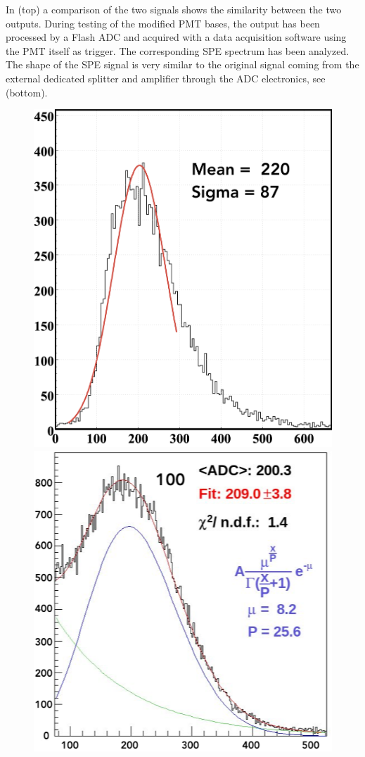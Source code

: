 In  (top) a comparison of the two signals shows the similarity between the two outputs.
During testing of the modified PMT bases, the output has been processed by a Flash ADC and acquired with a data
acquisition software using the PMT itself as trigger.
The corresponding SPE spectrum has been analyzed. The shape of the SPE signal is very similar to the original signal
coming from the external dedicated splitter and amplifier through the ADC electronics, see   (bottom).

\begin{figure}
	\centering
	\includegraphics[width=0.95\columnwidth,keepaspectratio]{img/fadcOutput.png}
	\includegraphics[width=0.97\columnwidth,keepaspectratio]{img/cc_signal.png}

\end{figure}
